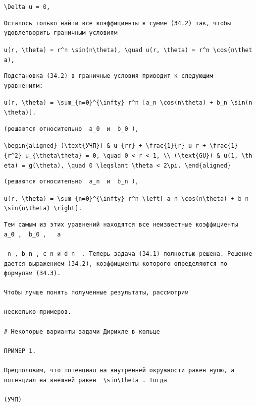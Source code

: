 \documentclass[
  ukrainian,
]{article}
\begin{document}
\texttt{\textbackslash{}Delta\ u\ =\ 0,}

\begin{verbatim}
Осталось только найти все коэффициенты в сумме (34.2) так, чтобы удовлетворить граничным условиям
\end{verbatim}

\texttt{u(r,\ \textbackslash{}theta)\ =\ r\^{}n\ \textbackslash{}sin(n\textbackslash{}theta),\ \textbackslash{}quad\ u(r,\ \textbackslash{}theta)\ =\ r\^{}n\ \textbackslash{}cos(n\textbackslash{}theta),}

\begin{verbatim}
Подстановка (34.2) в граничные условия приводит к следующим уравнениям:
\end{verbatim}

\texttt{u(r,\ \textbackslash{}theta)\ =\ \textbackslash{}sum\_\{n=0\}\^{}\{\textbackslash{}infty\}\ r\^{}n\ {[}a\_n\ \textbackslash{}cos(n\textbackslash{}theta)\ +\ b\_n\ \textbackslash{}sin(n\textbackslash{}theta){]}.}

\begin{verbatim}
(решаются относительно  a_0  и  b_0 ),
\end{verbatim}

\texttt{\textbackslash{}begin\{aligned\}\ (\textbackslash{}text\{УЧП\})\ \&\ u\_\{rr\}\ +\ \textbackslash{}frac\{1\}\{r\}\ u\_r\ +\ \textbackslash{}frac\{1\}\{r\^{}2\}\ u\_\{\textbackslash{}theta\textbackslash{}theta\}\ =\ 0,\ \textbackslash{}quad\ 0\ \textless{}\ r\ \textless{}\ 1,\ \textbackslash{}\textbackslash{}\ (\textbackslash{}text\{GU\})\ \&\ u(1,\ \textbackslash{}theta)\ =\ g(\textbackslash{}theta),\ \textbackslash{}quad\ 0\ \textbackslash{}leqslant\ \textbackslash{}theta\ \textless{}\ 2\textbackslash{}pi.\ \textbackslash{}end\{aligned\}}

\begin{verbatim}
(решаются относительно  a_n  и  b_n ),
\end{verbatim}

\texttt{u(r,\ \textbackslash{}theta)\ =\ \textbackslash{}sum\_\{n=0\}\^{}\{\textbackslash{}infty\}\ r\^{}n\ \textbackslash{}left{[}\ a\_n\ \textbackslash{}cos(n\textbackslash{}theta)\ +\ b\_n\ \textbackslash{}sin(n\textbackslash{}theta)\ \textbackslash{}right{]}.}

\begin{verbatim}
Тем самым из этих уравнений находятся все неизвестные коэффициенты  a_0 ,  b_0 ,   а

_n , b_n , c_n и d_n  . Теперь задача (34.1) полностью решена. Решение дается выражением (34.2), коэффициенты которого определяются по формулам (34.3).

Чтобы лучше понять полученные результаты, рассмотрим

несколько примеров.

# Некоторые варианты задачи Дирихле в кольце

ПРИМЕР 1.

Предположим, что потенциал на внутренней окружности равен нулю, а потенциал на внешней равен  \sin\theta . Тогда

(УЧП)
\end{verbatim}
\end{document}
